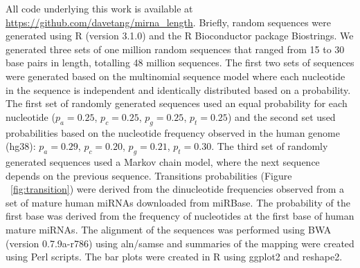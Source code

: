 \documentclass{article}
\begin{document}
All code underlying this work is available at \url{https://github.com/davetang/mirna_length}. Briefly, random sequences were generated using R (version 3.1.0) and the R Bioconductor package Biostrings\cite{biostrings_package}. We generated three sets of one million random sequences that ranged from 15 to 30 base pairs in length, totalling 48 million sequences. The first two sets of sequences were generated based on the multinomial sequence model where each nucleotide in the sequence is independent and identically distributed based on a probability. The first set of randomly generated sequences used an equal probability for each nucleotide ($p_{a} = 0.25$, $p_{c} = 0.25$, $p_{g} = 0.25$, $p_{t} = 0.25$) and the second set used probabilities based on the nucleotide frequency observed in the human genome (hg38): $p_{a} = 0.29$, $p_{c} = 0.20$, $p_{g} = 0.21$, $p_{t} = 0.30$. The third set of randomly generated sequences used a Markov chain model, where the next sequence depends on the previous sequence. Transitions probabilities (Figure ~\ref{fig:transition}) were derived from the dinucleotide frequencies observed from a set of mature human miRNAs downloaded from miRBase\cite{pmid21037258}. The probability of the first base was derived from the frequency of nucleotides at the first base of human mature miRNAs. The alignment of the sequences was performed using BWA\cite{pmid19451168} (version 0.7.9a-r786) using aln/samse and summaries of the mapping were created using Perl scripts. The bar plots were created in R using ggplot2\cite{ggplot2_book} and reshape2\cite{reshape_wickham}.
\end{document}

